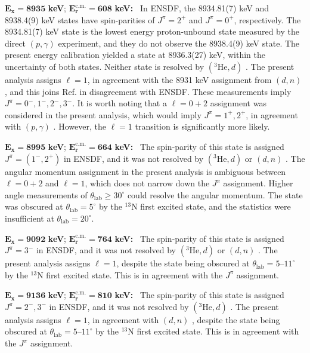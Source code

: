 \emph{$\mathbf{E_{x} = 8935}$} \textbf{keV}; \emph{$\mathbf{E^{\boldsymbol{\mathrm{c.m.}}}_{r} = 608}$} \textbf{keV:} \, 
In ENSDF, the 8934.81(7) keV and 8938.4(9) keV states have spin-parities of $J^{\pi} = 2^{+}$ and $J^{\pi} = 0^{+}$, respectively. The 8934.81(7) keV state is the lowest energy proton-unbound state measured by the direct $(p,\gamma)$ \cite{Kikstra1990} experiment, and they do not observe the 8938.4(9) keV state. The present energy calibration yielded a state at 8936.3(27) keV, within the uncertainty of both states. Neither state is resolved by $(^{3}\mathrm{He},d)$ \cite{Erskine1966,Seth1967,Cage1971}. The present analysis assigns $\ell=1$, in agreement with the 8931 keV assignment from $(d,n)$ \cite{Fuchs1969}, and this joins Ref. \cite{Fuchs1969} in disagreement with ENSDF. These measurements imply $J^{\pi} = 0^{-},1^{-},2^{-},3^{-}$. It is worth noting that a $\ell=0+2$ assignment was considered in the present analysis, which would imply $J^{\pi} = 1^{+},2^{+}$, in agreement with $(p,\gamma)$ \cite{Kikstra1990}. However, the $\ell=1$ transition is significantly more likely.

\emph{$\mathbf{E_{x} = 8995}$} \textbf{keV}; \emph{$\mathbf{E^{\boldsymbol{\mathrm{c.m.}}}_{r} = 664}$} \textbf{keV:} \, 
The spin-parity of this state is assigned $J^{\pi} = (1^{-},2^{+})$ in ENSDF, and it was not resolved by $(^{3}\mathrm{He},d)$ \cite{Erskine1966,Seth1967,Cage1971} or $(d,n)$ \cite{Fuchs1969}. The angular momentum assignment in the present analysis is ambiguous between $\ell=0+2$ and $\ell=1$, which does not narrow down the $J^{\pi}$ assignment. Higher angle measurements of $\theta_{\mathrm{lab}} \geq 30^{\circ}$ could resolve the angular momentum. The state was obscured at $\theta_{\mathrm{lab}} = 5^{\circ}$ by the $^{13}$N first excited state, and the statistics were insufficient at $\theta_{\mathrm{lab}} = 20^{\circ}$.

\emph{$\mathbf{E_{x} = 9092}$} \textbf{keV}; \emph{$\mathbf{E^{\boldsymbol{\mathrm{c.m.}}}_{r} = 764}$} \textbf{keV:} \, 
The spin-parity of this state is assigned $J^{\pi} = 3^{-}$ in ENSDF, and it was not resolved by $(^{3}\mathrm{He},d)$ \cite{Erskine1966,Seth1967,Cage1971} or $(d,n)$ \cite{Fuchs1969}. The present analysis assigns $\ell=1$, despite the state being obscured at $\theta_{\mathrm{lab}} = 5$--$11^{\circ}$ by the $^{13}$N first excited state. This is in agreement with the $J^{\pi}$ assignment.

\emph{$\mathbf{E_{x} = 9136}$} \textbf{keV}; \emph{$\mathbf{E^{\boldsymbol{\mathrm{c.m.}}}_{r} = 810}$} \textbf{keV:} \, 
The spin-parity of this state is assigned $J^{\pi} = 2^{-},3^{-}$ in ENSDF, and it was not resolved by $(^{3}\mathrm{He},d)$ \cite{Erskine1966,Seth1967,Cage1971}. The present analysis assigns $\ell=1$, in agreement with $(d,n)$ \cite{Fuchs1969}, despite the state being obscured at $\theta_{\mathrm{lab}} = 5$--$11^{\circ}$ by the $^{13}$N first excited state. This is in agreement with the $J^{\pi}$ assignment.

